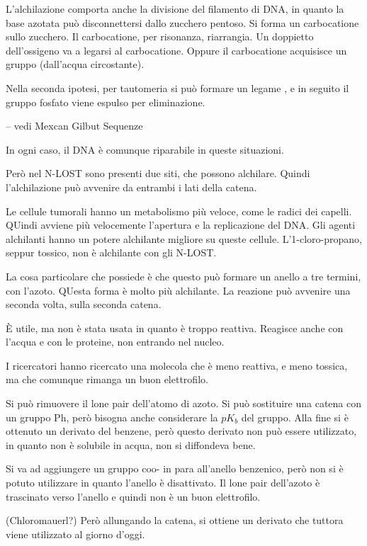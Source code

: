 L'alchilazione comporta anche la divisione del filamento di DNA, in
quanto la base azotata può disconnettersi dallo zucchero pentoso. Si
forma un carbocatione sullo zucchero. Il carbocatione, per risonanza,
riarrangia. Un doppietto dell'ossigeno va a legarsi al carbocatione.
Oppure il carbocatione acquisisce un gruppo  (dall'acqua
circostante).

Nella seconda ipotesi, per tautomeria si può formare un legame ,
e in seguito il gruppo fosfato viene espulso per eliminazione.

-- vedi Mexcan Gilbut Sequenze

In ogni caso, il DNA è comunque riparabile in queste situazioni.

Però nel N-LOST sono presenti due siti, che possono alchilare. Quindi
l'alchilazione può avvenire da entrambi i lati della catena.

Le cellule tumorali hanno un metabolismo più veloce, come le radici dei
capelli. QUindi avviene più velocemente l'apertura e la replicazione del
DNA. Gli agenti alchilanti hanno un potere alchilante migliore su queste
cellule.
L'1-cloro-propano, seppur tossico, non è alchilante con gli N-LOST.

La cosa particolare che possiede è che questo può formare un anello a
tre termini, con l'azoto. QUesta forma è molto più alchilante. La
reazione può avvenire una seconda volta, sulla seconda catena.

È utile, ma non è stata usata in quanto è troppo reattiva. Reagisce
anche con l'acqua e con le proteine, non entrando nel nucleo.

I ricercatori hanno ricercato una molecola che è meno reattiva, e meno
tossica, ma che comunque rimanga un buon elettrofilo.

Si può rimuovere il lone pair dell'atomo di azoto. Si può sostituire una
catena con un gruppo Ph, però bisogna anche considerare la \(pK_b\) del
gruppo. Alla fine si è ottenuto un derivato del benzene, però questo
derivato non può essere utilizzato, in quanto non è solubile in acqua,
non si diffondeva bene.

Si va ad aggiungere un gruppo coo- in para all'anello benzenico, però
non si è potuto utilizzare in quanto l'anello è disattivato. Il lone
pair dell'azoto è trascinato verso l'anello e quindi non è un buon
elettrofilo.

(Chloromauerl?) Però allungando la catena, si ottiene un derivato che
tuttora viene utilizzato al giorno d'oggi.


